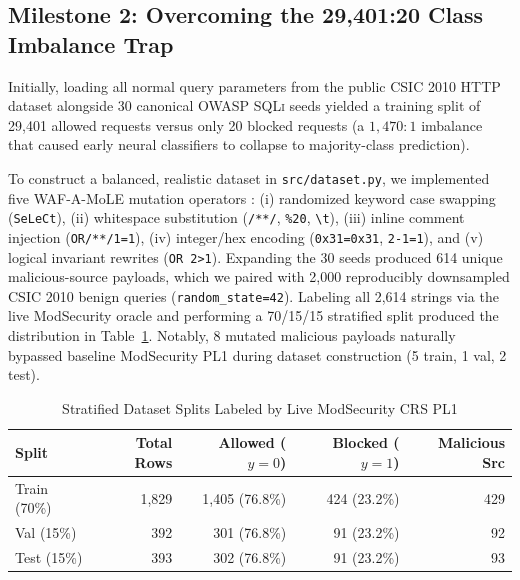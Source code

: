 \documentclass[conference]{IEEEtran}
\newcommand{\SQLi}{\textsc{SQLi}}
\begin{document}
\subsection{Milestone 2: Overcoming the 29,401:20 Class Imbalance Trap}
Initially, loading all normal query parameters from the public CSIC 2010 HTTP dataset \cite{csic2010} alongside 30 canonical OWASP \SQLi{} seeds yielded a training split of 29,401 allowed requests versus only 20 blocked requests (a $1,470:1$ imbalance that caused early neural classifiers to collapse to majority-class prediction).

To construct a balanced, realistic dataset in \texttt{src/dataset.py}, we implemented five WAF-A-MoLE mutation operators \cite{demetrio2020}: (i) randomized keyword case swapping (\texttt{SeLeCt}), (ii) whitespace substitution (\texttt{/**/}, \texttt{\%20}, \texttt{\textbackslash t}), (iii) inline comment injection (\texttt{OR/**/1=1}), (iv) integer/hex encoding (\texttt{0x31=0x31}, \texttt{2-1=1}), and (v) logical invariant rewrites (\texttt{OR 2>1}). Expanding the 30 seeds produced 614 unique malicious-source payloads, which we paired with 2,000 reproducibly downsampled CSIC 2010 benign queries (\texttt{random\_state=42}). Labeling all 2,614 strings via the live ModSecurity oracle and performing a 70/15/15 stratified split produced the distribution in Table~\ref{tab:splits}. Notably, 8 mutated malicious payloads naturally bypassed baseline ModSecurity PL1 during dataset construction (5 train, 1 val, 2 test).

\begin{table}[t]
\centering
\caption{Stratified Dataset Splits Labeled by Live ModSecurity CRS PL1}
\label{tab:splits}
\footnotesize
\setlength{\tabcolsep}{4pt}
\begin{tabular}{lrrrr}
\toprule
Split & Total Rows & Allowed ($y=0$) & Blocked ($y=1$) & Malicious Src\\
\midrule
Train (70\%) & 1,829 & 1,405 (76.8\%) & 424 (23.2\%) & 429\\
Val (15\%) & 392 & 301 (76.8\%) & 91 (23.2\%) & 92\\
Test (15\%) & 393 & 302 (76.8\%) & 91 (23.2\%) & 93\\
\bottomrule
\end{tabular}
\end{table}
\end{document}
